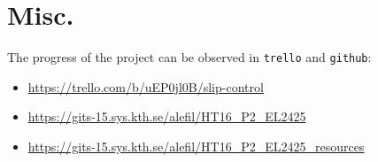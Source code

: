 \documentclass[oneside,12pt]{article}
\begin{document}
\section{Misc.}

The progress of the project can be observed in \texttt{trello} and \texttt{github}:

\begin{itemize}
  \item \url{https://trello.com/b/uEP0jl0B/slip-control}
  \item \url{https://gits-15.sys.kth.se/alefil/HT16_P2_EL2425}
  \item \url{https://gits-15.sys.kth.se/alefil/HT16_P2_EL2425_resources}
\end{itemize}
\end{document}
